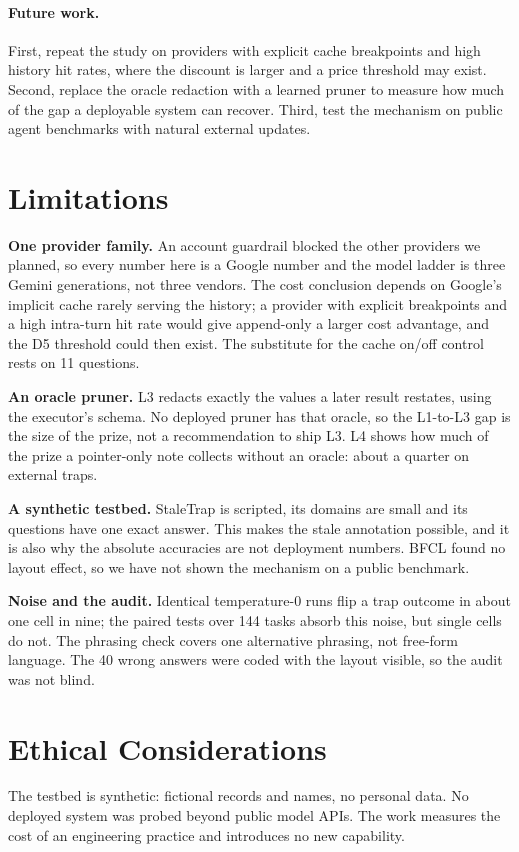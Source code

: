 \paragraph{Future work.} First, repeat the study on providers with explicit cache breakpoints and high history hit rates, where the discount is larger and a price threshold may exist. Second, replace the oracle redaction with a learned pruner to measure how much of the gap a deployable system can recover. Third, test the mechanism on public agent benchmarks with natural external updates.

\section*{Limitations}
\textbf{One provider family.} An account guardrail blocked the other providers we planned, so every number here is a Google number and the model ladder is three Gemini generations, not three vendors. The cost conclusion depends on Google's implicit cache rarely serving the history; a provider with explicit breakpoints and a high intra-turn hit rate \citep{a2608_00101} would give append-only a larger cost advantage, and the D5 threshold could then exist. The substitute for the cache on/off control rests on 11 questions.

\textbf{An oracle pruner.} L3 redacts exactly the values a later result restates, using the executor's schema. No deployed pruner has that oracle, so the L1-to-L3 gap is the size of the prize, not a recommendation to ship L3. L4 shows how much of the prize a pointer-only note collects without an oracle: about a quarter on external traps.

\textbf{A synthetic testbed.} StaleTrap is scripted, its domains are small and its questions have one exact answer. This makes the stale annotation possible, and it is also why the absolute accuracies are not deployment numbers. BFCL found no layout effect, so we have not shown the mechanism on a public benchmark.

\textbf{Noise and the audit.} Identical temperature-0 runs flip a trap outcome in about one cell in nine; the paired tests over 144 tasks absorb this noise, but single cells do not. The phrasing check covers one alternative phrasing, not free-form language. The 40 wrong answers were coded with the layout visible, so the audit was not blind.

\section*{Ethical Considerations}
The testbed is synthetic: fictional records and names, no personal data. No deployed system was probed beyond public model APIs. The work measures the cost of an engineering practice and introduces no new capability.

